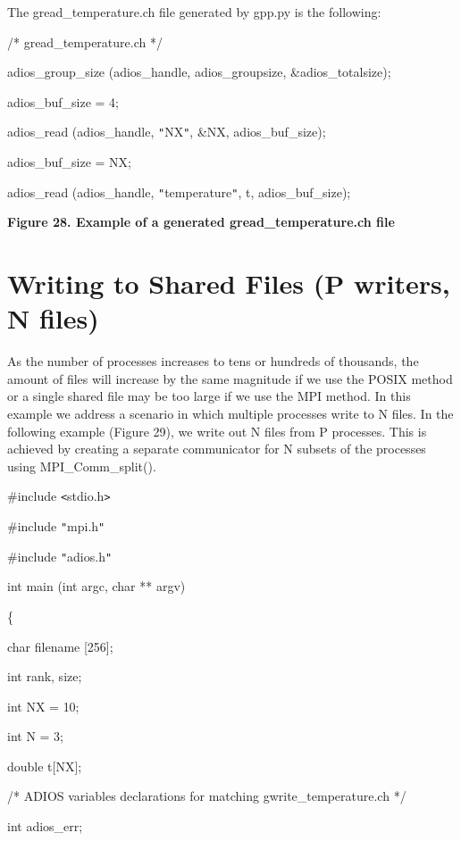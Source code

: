 The gread\_temperature.ch file generated by gpp.py is the following:

/* gread\_temperature.ch */

adios\_group\_size (adios\_handle, adios\_groupsize, \&adios\_totalsize);

adios\_buf\_size = 4;

adios\_read (adios\_handle, \texttt{"}NX\texttt{"}, \&NX, adios\_buf\_size);

adios\_buf\_size = NX;

adios\_read (adios\_handle, \texttt{"}temperature\texttt{"}, t, adios\_buf\_size);

\label{HToc144350187}

\leftskip=18pt
{\color{color20} \textbf{Figure 28. Example of a generated gread\_temperature.ch 
file\label{HToc182553446}}}

\section{Writing to Shared Files (P writers, N files)}

\leftskip=0pt
As the number of processes increases to tens or hundreds of thousands, the amount 
of files will increase by the same magnitude if we use the POSIX method or a single 
shared file may be too large if we use the MPI method. In this example we address 
a scenario in which multiple processes write to N files. In the following example 
(Figure 29), we write out N files from P processes. This is achieved by creating 
a separate communicator for N subsets of the processes using MPI\_Comm\_split(). 

\#include \texttt{<}stdio.h\texttt{>}

\#include \texttt{"}mpi.h\texttt{"}

\#include \texttt{"}adios.h\texttt{"}

int main (int argc, char ** argv) 

\{

\leftskip=18pt
char      \textbf{    } filename [256];

int              rank, size;

int              NX\textbf{ }=\textbf{ }10; 

{\color{color02} int              N = 3;}

double      t[NX];

/* ADIOS variables declarations for matching gwrite\_temperature.ch */

int        \textbf{         }adios\_err;

